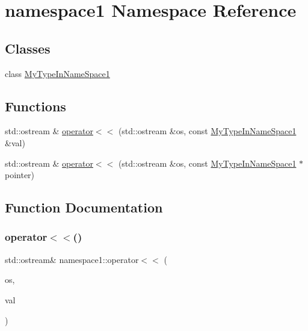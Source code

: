 \hypertarget{namespacenamespace1}{}\section{namespace1 Namespace Reference}
\label{namespacenamespace1}
\subsection*{Classes}
\begin{DoxyCompactItemize}
\item 
class \hyperlink{classnamespace1_1_1_my_type_in_name_space1}{My\+Type\+In\+Name\+Space1}
\end{DoxyCompactItemize}
\subsection*{Functions}
\begin{DoxyCompactItemize}
\item 
std\+::ostream \& \hyperlink{namespacenamespace1_acfbce4e68e4055891e9ca30f7d4cbf82}{operator$<$$<$} (std\+::ostream \&os, const \hyperlink{classnamespace1_1_1_my_type_in_name_space1}{My\+Type\+In\+Name\+Space1} \&val)
\item 
std\+::ostream \& \hyperlink{namespacenamespace1_ac377ddc8113167c034b1e3d7a7c6262d}{operator$<$$<$} (std\+::ostream \&os, const \hyperlink{classnamespace1_1_1_my_type_in_name_space1}{My\+Type\+In\+Name\+Space1} $\ast$pointer)
\end{DoxyCompactItemize}


\subsection{Function Documentation}
\mbox{\label{namespacenamespace1_acfbce4e68e4055891e9ca30f7d4cbf82}} 
\subsubsection{\texorpdfstring{operator$<$$<$()}{operator<<()}\hspace{0.1cm}{\footnotesize\ttfamily [1/2]}}
{\footnotesize\ttfamily std\+::ostream\& namespace1\+::operator$<$$<$ (\begin{DoxyParamCaption}\item[{std\+::ostream \&}]{os,  }\item[{const \hyperlink{classnamespace1_1_1_my_type_in_name_space1}{My\+Type\+In\+Name\+Space1} \&}]{val }\end{DoxyParamCaption})}

